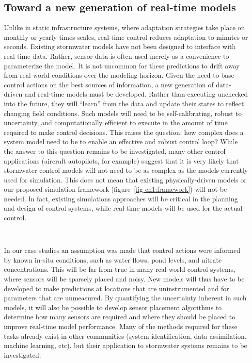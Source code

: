 \subsection{Toward a new generation of real-time models}
Unlike in static infrastructure systems, where adaptation strategies take place on monthly or yearly times scales, real-time control reduces adaptation to minutes or seconds. Existing stormwater models have not been designed to interface with real-time data. Rather, sensor data is often used merely as a convenience to parameterize the model. It is not uncommon for these predictions to drift away from real-world conditions over the modeling horizon. Given the need to base control actions on the best sources of information, a new generation of data-driven and real-time models must be developed. Rather than executing unchecked into the future, they will ``learn'' from the data and update their states to reflect changing field conditions. Such models will need to be self-calibrating, robust to uncertainty, and computationally efficient to execute in the amount of time required to make control decisions. This raises the question: how complex does a system model need to be to enable an effective and robust control loop? While the answer to this question remains to be investigated, many other control applications (aircraft autopilots, for example) suggest that it is very likely that stormwater control models will not need to be as complex as the models currently used for simulation. This does not mean that existing physically-driven models or our proposed simulation framework (figure~\ref{fig-ch1:framework}) will not be needed. In fact, existing simulations approaches will be critical in the planning and design of control systems, while real-time models will be used for the actual control.

\

In our case studies an assumption was made that control actions were informed by known in-situ conditions, such as water flows, pond levels, and nitrate concentrations. This will be far from true in many real-world control systems, where sensors will be sparsely placed and noisy. New models will thus have to be developed to make predictions at locations that are uninstrumented and for parameters that are unmeasured.  By quantifying the uncertainty inherent in such models, it will also be possible to develop sensor placement algorithms to determine how many sensors are required and where they should be placed to improve real-time model performance. Many of the methods required for these tasks already exist in other communities (system identification, data assimilation, machine learning, etc), but their application to stormwater systems remains to be investigated.



